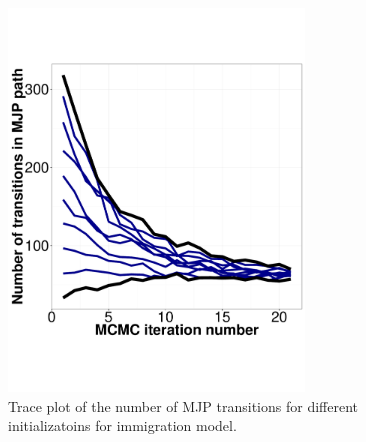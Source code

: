 \begin{figure}
  \begin{minipage}[!hp]{0.45\linewidth}
  \centering
    \includegraphics [width=0.70\textwidth, angle=0]{figs/q3_k2_path_transition.pdf}
    \vspace{-0 in}
    \caption{Trace plot of the number of MJP transitions for different initializatoins for immigration model.}
     \label{fig:ESS_EXP_TRANSITION}
  \end{minipage}
\end{figure}

